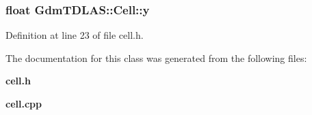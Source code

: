 \subsubsection[{y}]{\setlength{\rightskip}{0pt plus 5cm}float {\bf GdmTDLAS::Cell::y}\hspace{0.3cm}{\ttfamily  [private]}}\label{classGdmTDLAS_1_1Cell_adbc128996c4b2f15df20a15d8a310f0b}


Definition at line 23 of file cell.h.



The documentation for this class was generated from the following files:\begin{DoxyCompactItemize}
\item 
{\bf cell.h}\item 
{\bf cell.cpp}\end{DoxyCompactItemize}

